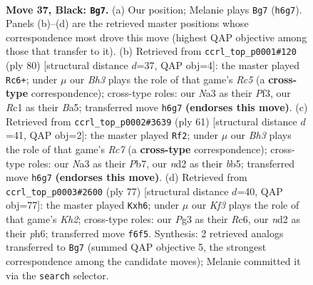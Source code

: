 \documentclass[11pt]{article}
\begin{document}
\clearpage

\begin{figure}[p]\centering
\begin{subfigure}{0.46\textwidth}\centering
\resizebox{\linewidth}{!}{%
\newchessgame
\chessboard[
  setfen={7Q/8/1p3kpb/2pB4/7P/n5pK/3NR3/2r5 b - - 3 37},
  showmover=false,
  pgfstyle=straightmove, color=movearrow, markmove={h6-g7}
]}
\caption{}
\end{subfigure}\hfill
\begin{subfigure}{0.46\textwidth}\centering
\resizebox{\linewidth}{!}{%
\newchessgame
\chessboard[
  setfen={8/8/3k4/BPRnpp2/8/3r1PPp/7P/6K1 w - - 11 41},
  showmover=false,
  pgfstyle=straightmove, color=movearrow, markmove={c5-c6}
]}
\caption{}
\end{subfigure}
\\[4pt]
\begin{subfigure}{0.46\textwidth}\centering
\resizebox{\linewidth}{!}{%
\newchessgame
\chessboard[
  setfen={6k1/1p5p/5pp1/1Bbp4/8/5N1P/2r4P/3R3K b - - 1 31},
  showmover=false,
  pgfstyle=straightmove, color=movearrow, markmove={c2-f2}
]}
\caption{}
\end{subfigure}\hfill
\begin{subfigure}{0.46\textwidth}\centering
\resizebox{\linewidth}{!}{%
\newchessgame
\chessboard[
  setfen={8/p6k/2r3pP/4ppNb/7P/8/2BK4/5R2 b - - 1 39},
  showmover=false,
  pgfstyle=straightmove, color=movearrow, markmove={h7-h6}
]}
\caption{}
\end{subfigure}
\caption{\textbf{Move 37, Black: \texttt{Bg7}.} (a) Our position; Melanie plays \texttt{Bg7} (\texttt{h6g7}). Panels (b)--(d) are the retrieved master positions whose correspondence most drove this move (highest QAP objective among those that transfer to it). (b) Retrieved from \texttt{ccrl\_top\_p0001\#120} (ply 80) [structural distance $d$=37, QAP obj=4]: the master played \texttt{Rc6+}; under $\mu$ our \emph{Bh3} plays the role of that game's \emph{Rc5} (a \textbf{cross-type} correspondence); cross-type roles: our \emph{N}a3 as their \emph{P}f3, our \emph{R}c1 as their \emph{B}a5; transferred move \texttt{h6g7} \textbf{(endorses this move)}. (c) Retrieved from \texttt{ccrl\_top\_p0002\#3639} (ply 61) [structural distance $d$=41, QAP obj=2]: the master played \texttt{Rf2}; under $\mu$ our \emph{Bh3} plays the role of that game's \emph{Rc7} (a \textbf{cross-type} correspondence); cross-type roles: our \emph{N}a3 as their \emph{P}b7, our \emph{n}d2 as their \emph{b}b5; transferred move \texttt{h6g7} \textbf{(endorses this move)}. (d) Retrieved from \texttt{ccrl\_top\_p0003\#2600} (ply 77) [structural distance $d$=40, QAP obj=77]: the master played \texttt{Kxh6}; under $\mu$ our \emph{Kf3} plays the role of that game's \emph{Kh2}; cross-type roles: our \emph{P}g3 as their \emph{R}c6, our \emph{n}d2 as their \emph{p}h6; transferred move \texttt{f6f5}. Synthesis: 2 retrieved analogs transferred to \texttt{Bg7} (summed QAP objective 5, the strongest correspondence among the candidate moves); Melanie committed it via the \texttt{search} selector.}
\label{fig:thought-m73}
\end{figure}
\end{document}
